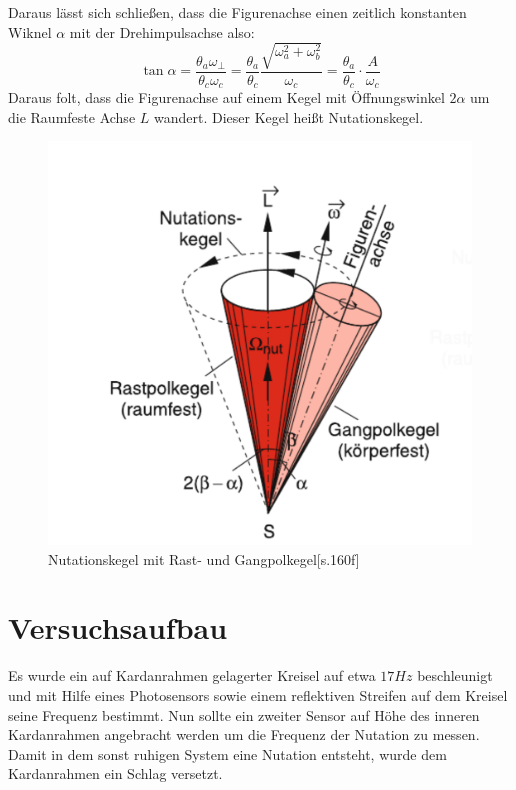 \documentclass{include/protokollclass}
\begin{document}
    Daraus lässt sich schließen, dass die Figurenachse einen zeitlich konstanten Wiknel $\alpha$ mit der Drehimpulsachse also: 
    \begin{equation}
        \tan\alpha=\frac{\theta_a\omega_{\perp}}{\theta_c\omega_c}=\frac{\theta_a}{\theta_c}\frac{\sqrt{\omega_a^2+\omega_b^2}}{\omega_c}=\frac{\theta_a}{\theta_c}\cdot\frac{A}{\omega_c}
    \end{equation}
    Daraus folt, dass die Figurenachse auf einem Kegel mit Öffnungswinkel $2\alpha$ um die Raumfeste Achse $L$ wandert. Dieser Kegel heißt Nutationskegel\cite[vgl. S.160f]{Demtroeder2017}.
    \begin{figure}[h]
        \centering
        \includegraphics[scale=0.3]{fig/nutationskegel.pdf}
        \caption{Nutationskegel mit Rast- und Gangpolkegel\cite{Demtroeder2017}[s.160f]}
        \label{fig:nutkegel}
    \end{figure}
    
    \section{Versuchsaufbau}
    Es wurde ein auf Kardanrahmen gelagerter Kreisel auf etwa $17Hz$ beschleunigt und mit Hilfe eines Photosensors sowie einem reflektiven Streifen auf dem Kreisel seine Frequenz bestimmt. Nun sollte ein zweiter Sensor auf Höhe des inneren Kardanrahmen angebracht werden um die Frequenz der Nutation zu messen. Damit in dem sonst ruhigen System eine Nutation entsteht, wurde dem Kardanrahmen ein Schlag versetzt.
\end{document}
